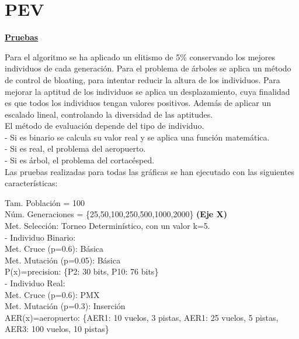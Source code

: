 \section{PEV}

	\begin{flushleft}			
	\begin{mdframed}[roundcorner=5pt]
		\textbf{\underline{Pruebas}}
		\vspace{0.1cm}
		
		\scriptsize		
		Para el algoritmo se ha aplicado un elitismo de 5\% conservando los mejores individuos de cada generación. Para el problema de árboles se aplica un método de control de bloating, para intentar reducir la altura de los individuos. 		
		Para mejorar la aptitud de los individuos se aplica un desplazamiento, cuya finalidad es que todos los individuos tengan valores positivos. Además de aplicar un escalado lineal, controlando la diversidad de las aptitudes.\\
		
		El método de evaluación depende del tipo de individuo. \\
		- Si es binario se calcula su valor real y se aplica una función matemática.  \\
		- Si es real, el problema del aeropuerto. \\
		- Si es árbol, el problema del cortacésped.\\
		
		Las pruebas realizadas para todas las gráficas se han ejecutado con las siguientes características:
		\begin{tcolorbox}[boxrule=0.5pt, fontupper=\small]
			\scriptsize
			Tam. Población = 100\\
			Núm. Generaciones = \{25,50,100,250,500,1000,2000\} \textbf{(Eje X)}\\
			Met. Selección: Torneo Determinístico, con un valor k=5.\\
			
			- Individuo Binario:\\
			Met. Cruce (p=0.6): Básica\\
			Met. Mutación (p=0.05): Básica \\
			P(x)=precision: \{P2: 30 bits, P10: 76 bits\}\\
			
			- Individuo Real:\\
			Met. Cruce (p=0.6): PMX\\
			Met. Mutación (p=0.3): Inserción \\
			AER(x)=aeropuerto: \{AER1: 10 vuelos, 3 pistas, AER1: 25 vuelos, 5 pistas, AER3: 100 vuelos, 10 pistas\}\\
			

\end{tcolorbox}
\end{mdframed}
\end{flushleft}
